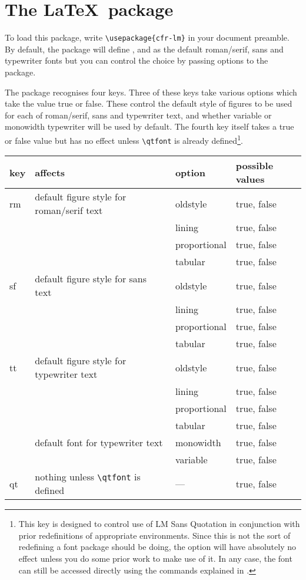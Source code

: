 \documentclass[11pt,british,a4paper]{article}
\begin{document}
\section{The \LaTeX\ package}\label{sec:support}

To load this package, write \verb|\usepackage{cfr-lm}| in your document preamble. By default, the package will define ,  and  as the default roman/serif, sans and typewriter fonts but you can control the choice by passing options to the package.

The package recognises four keys. Three of these keys take various options which take the value true or false. These control the default style of figures to be used for each of roman/serif, sans and typewriter text, and whether variable or monowidth typewriter will be used by default. The fourth key itself takes a true or false value but has no effect unless \verb|\qtfont| is already defined\footnote{This key is designed to control use of LM Sans Quotation in conjunction with prior redefinitions of appropriate environments. Since this is not the sort of redefining a font package should be doing, the option will have absolutely no effect unless you do some prior work to make use of it. In any case, the font can still be accessed directly using the commands explained in .}.
	\begin{longtable}{l>{\raggedright}p{}>{\raggedright}ll}
		\toprule
		\textbf{key}	&	\textbf{affects}	&	\textbf{option}	&	 \textbf{possible values}\tabularnewline\midrule\endhead
		\bottomrule\endfoot
		rm	& default figure style for roman/serif text	&	oldstyle				&	true, false			\tabularnewline\cmidrule{3-4}
				&																					&	lining					&	true, false			\tabularnewline\cmidrule{3-4}
				&																					&	proportional		&	true, false			\tabularnewline\cmidrule{3-4}
				&																					&	tabular				&	true, false			\tabularnewline\midrule
		sf		& default figure style for sans text					&	oldstyle				&	true, false			\tabularnewline\cmidrule{3-4}
				&																					&	lining					&	true, false			\tabularnewline\cmidrule{3-4}
				&																					&	proportional		&	true, false			\tabularnewline\cmidrule{3-4}
				&																					&	tabular				&	true, false			\tabularnewline\midrule
		tt		& default figure style for typewriter text		&	oldstyle				&	true, false			\tabularnewline\cmidrule{3-4}
				&																					&	lining					&	true, false			\tabularnewline\cmidrule{3-4}
				&																					&	proportional		&	true, false			\tabularnewline\cmidrule{3-4}
				&																					&	tabular				&	true, false			\tabularnewline\cmidrule{2-4}
				&	default font for typewriter text					&	monowidth			&	true, false			\tabularnewline\cmidrule{3-4}
				& 																					&	variable				&	true, false			\tabularnewline\midrule
		qt		&	nothing unless \verb|\qtfont| is defined		&	---						&	true, false			\tabularnewline
	\end{longtable}
\end{document}
